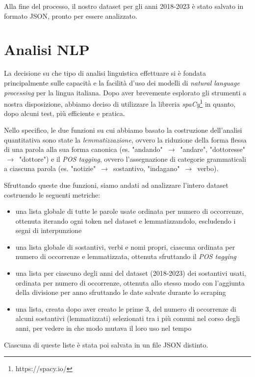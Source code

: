 \documentclass[11pt]{article}
\begin{document}
Alla fine del processo, il nostro dataset per gli anni 2018-2023 è stato salvato in formato
JSON, pronto per essere analizzato.

\section{Analisi NLP}
La decisione su che tipo di analisi linguistica effettuare si è fondata principalmente
sulle capacità e la facilità d'uso dei modelli di \textit{natural language processing}
per la lingua italiana. Dopo aver brevemente esplorato gli strumenti a nostra disposizione,
abbiamo deciso di utilizzare la libreria \textit{spaCy}\footnote{https://spacy.io/} in
quanto, dopo alcuni test, più efficiente e pratica.

Nello specifico, le due funzioni su cui abbiamo basato la costruzione dell'analisi
quantitativa sono state la \textit{lemmatizzazione}, ovvero la riduzione della forma
flessa di una parola alla sua forma canonica (es. "andando" $\,\to\,$ "andare", "dottoresse" $\,\to\,$ "dottore") e il \textit{POS tagging}, ovvero l'assegnazione di
categorie grammaticali a ciascuna parola (es. "notizie" $\,\to\,$ sostantivo, "indagano" $\,\to\,$ verbo).

Sfruttando queste due funzioni, siamo andati ad analizzare l'intero dataset costruendo
le seguenti metriche:
\begin{itemize}
\item una lista globale di tutte le parole usate ordinata per numero di occorrenze, ottenuta iterando ogni token nel dataset e lemmatizzandolo, escludendo i segni di interpunzione
\item una lista globale di sostantivi, verbi e nomi propri, ciascuna ordinata per numero di occorrenze e lemmatizzata, ottenuta sfruttando il \textit{POS tagging}
\item una lista per ciascuno degli anni del dataset (2018-2023) dei sostantivi usati, ordinata per numero di occorrenze, ottenuta allo stesso modo con l'aggiunta della divisione per anno sfruttando le date salvate durante lo scraping
\item una lista, creata dopo aver creato le prime 3, del numero di occorrenze di alcuni sostantivi (lemmatizzati) selezionati tra i più comuni nel corso degli anni, per vedere in che modo mutava il loro uso nel tempo
\end{itemize}

Ciascuna di queste liste è stata poi salvata in un file JSON distinto.
\end{document}
